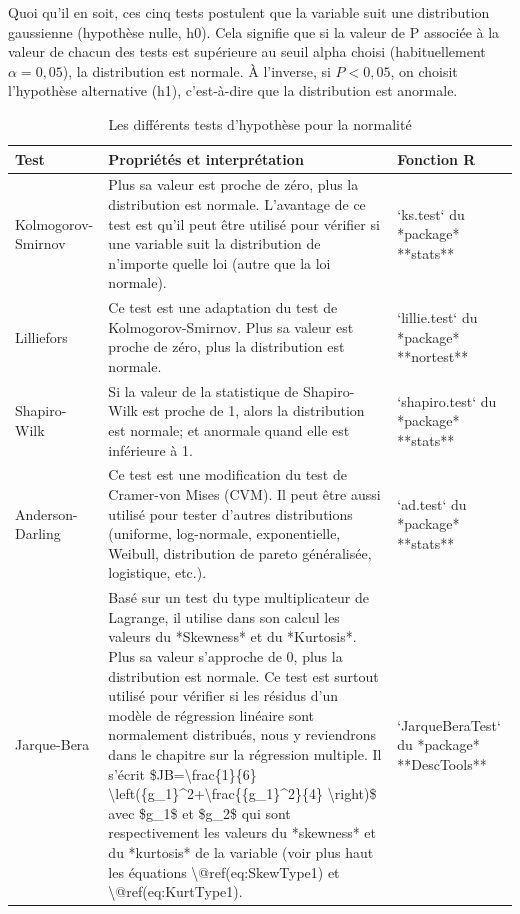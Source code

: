 \documentclass[
  11pt,
  french,
]{book}
\begin{document}
Quoi qu'il en soit, ces cinq tests postulent que la variable suit une distribution gaussienne (hypothèse nulle, h0). Cela signifie que si la valeur de P associée à la valeur de chacun des tests est supérieure au seuil alpha choisi (habituellement \(\alpha=0,05\)), la distribution est normale. À l'inverse, si \(P<0,05\), on choisit l'hypothèse alternative (h1), c'est-à-dire que la distribution est anormale.

\begin{table}

\caption{\label{tab:testnormalites}Les différents tests d'hypothèse pour la normalité}
\centering
\fontsize{8}{10}\selectfont
\begin{tabular}[t]{l>{\raggedright\arraybackslash}p{6cm}>{\raggedright\arraybackslash}p{6cm}}
\toprule
Test & Propriétés et interprétation & Fonction R\\
\midrule
Kolmogorov-Smirnov & Plus sa valeur est proche de zéro, plus la distribution est normale.  L'avantage de ce test est qu'il peut être utilisé pour vérifier si une variable suit la distribution de n'importe quelle loi (autre que la loi normale). & `ks.test` du *package* **stats**\\
Lilliefors & Ce test est une adaptation du test de Kolmogorov-Smirnov. Plus sa valeur est proche de zéro, plus la distribution est normale. & `lillie.test` du *package* **nortest**\\
Shapiro-Wilk & Si la valeur de la statistique de Shapiro-Wilk est proche de 1, alors la distribution est normale; et anormale quand elle est inférieure à 1. & `shapiro.test` du *package* **stats**\\
Anderson-Darling & Ce test est une modification du test de Cramer-von Mises (CVM). Il peut être aussi utilisé pour tester d'autres distributions (uniforme, log-normale, exponentielle, Weibull, distribution de pareto généralisée, logistique, etc.). & `ad.test` du *package* **stats**\\
Jarque-Bera & Basé sur un test du type multiplicateur de Lagrange, il utilise dans son calcul les valeurs du *Skewness* et du *Kurtosis*. Plus sa valeur s'approche de 0, plus la distribution est normale. Ce test est surtout utilisé pour vérifier si les résidus d'un modèle de régression linéaire sont normalement distribués, nous y reviendrons dans le chapitre sur la régression multiple. Il s'écrit \$JB=\textbackslash{}frac\{1\}\{6\} \textbackslash{}left(\{g\_1\}\textasciicircum{}2+\textbackslash{}frac\{\{g\_1\}\textasciicircum{}2\}\{4\} \textbackslash{}right)\$ avec \$g\_1\$ et \$g\_2\$ qui sont respectivement les valeurs du *skewness* et du *kurtosis* de la variable (voir plus haut les équations \textbackslash{}@ref(eq:SkewType1) et \textbackslash{}@ref(eq:KurtType1). & `JarqueBeraTest` du *package* **DescTools**\\
\bottomrule
\end{tabular}
\end{table}
\end{document}
